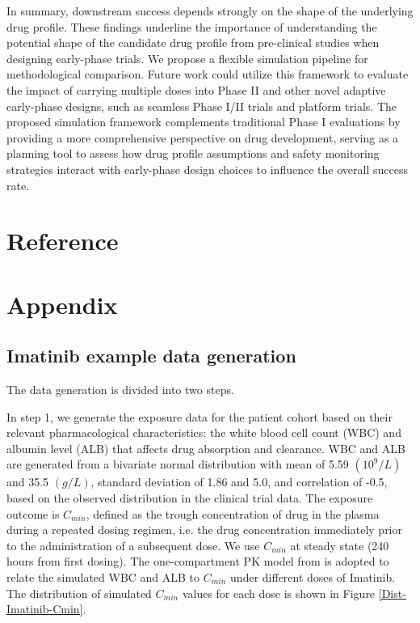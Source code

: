 \documentclass[11pt]{article}
\begin{document}
In summary, downstream success depends strongly on the shape of the underlying drug profile. These findings underline the importance of understanding the potential shape of the candidate drug profile from pre-clinical studies when designing early-phase trials. We propose a flexible simulation pipeline for methodological comparison. Future work could utilize this framework to evaluate the impact of carrying multiple doses into Phase II and other novel adaptive early-phase designs, such as seamless Phase I/II trials and platform trials. The proposed simulation framework complements traditional Phase I evaluations by providing a more comprehensive perspective on drug development, serving as a planning tool to assess how drug profile assumptions and safety monitoring strategies interact with early-phase design choices to influence the overall success rate.


\newpage
{}
\section*{Reference}
\printbibliography [heading=none]

\appendix
\renewcommand{\thefigure}{S\arabic{figure}}
\setcounter{figure}{0}
\renewcommand{\thetable}{S\arabic{table}}
\setcounter{table}{0}
\newpage
\section*{Appendix}
\subsection*{Imatinib example data generation}
The data generation is divided into two steps. 

In step 1, we generate the exposure data for the patient cohort based on their relevant pharmacological characteristics: the white blood cell count (WBC) and albumin level (ALB) that affects drug absorption and clearance. WBC and ALB are generated from a bivariate normal distribution with mean of 5.59 $(10^9/L)$ and 35.5 $(g/L)$, standard deviation of 1.86 and 5.0, and correlation of -0.5, based on the observed distribution in the clinical trial data. The exposure outcome is $C_{min}$, defined as the trough concentration of drug in the plasma during a repeated dosing regimen, i.e. the drug concentration immediately prior to the administration of a subsequent dose. We use $C_{min}$ at steady state (240 hours from first dosing). The one-compartment PK model from \textcite{demetri2009imatinib} is adopted to relate the simulated WBC and ALB to $C_{min}$ under different doses of Imatinib. The distribution of simulated $C_{min}$ values for each dose is shown in Figure \ref{Dist-Imatinib-Cmin}.
\end{document}
